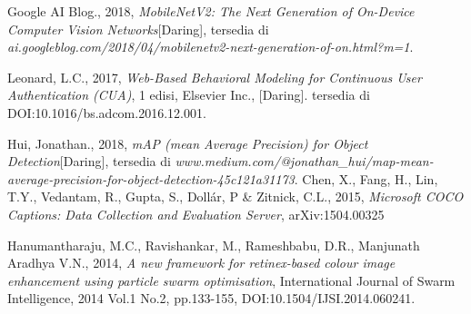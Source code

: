 \documentclass{tesisilkomugm}
\begin{document}
\begin{thebibliography}{99}
Google AI Blog., 2018, \emph{MobileNetV2: The Next Generation of On-Device Computer Vision Networks}[Daring], tersedia di \emph{ai.googleblog.com/2018/04/mobilenetv2-next-generation-of-on.html?m=1}.

Leonard, L.C., 2017, \emph{Web-Based Behavioral Modeling for Continuous User 
	Authentication (CUA)}, 1 edisi, Elsevier Inc., [Daring]. tersedia di 
DOI:10.1016/bs.adcom.2016.12.001.

Hui, Jonathan., 2018, \emph{mAP (mean Average Precision) for Object Detection}[Daring], tersedia di \emph{www.medium.com/@jonathan\_hui/map-mean-average-precision-for-object-detection-45c121a31173}.
Chen, X., Fang, H., Lin, T.Y., Vedantam, R., Gupta, S., Dollár, P \& Zitnick, C.L., 2015, \emph{Microsoft COCO Captions: Data Collection and Evaluation Server}, arXiv:1504.00325

Hanumantharaju, M.C., Ravishankar, M., Rameshbabu, D.R., Manjunath Aradhya V.N., 2014, \emph{A new framework for retinex-based colour image enhancement using particle swarm optimisation}, International Journal of Swarm Intelligence, 2014 Vol.1 No.2, pp.133-155, DOI:10.1504/IJSI.2014.060241.
\end{thebibliography}



\appendix


\end{document}
